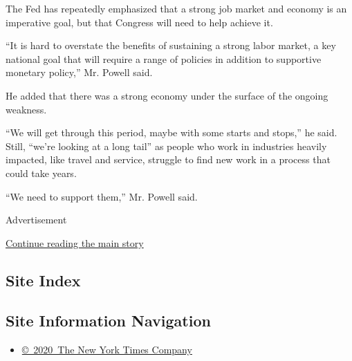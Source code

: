 The Fed has repeatedly emphasized that a strong job market and economy
is an imperative goal, but that Congress will need to help achieve it.

``It is hard to overstate the benefits of sustaining a strong labor
market, a key national goal that will require a range of policies in
addition to supportive monetary policy,'' Mr. Powell said.

He added that there was a strong economy under the surface of the
ongoing weakness.

``We will get through this period, maybe with some starts and stops,''
he said. Still, ``we're looking at a long tail'' as people who work in
industries heavily impacted, like travel and service, struggle to find
new work in a process that could take years.

``We need to support them,'' Mr. Powell said.

Advertisement

\protect\hyperlink{after-bottom}{Continue reading the main story}

\hypertarget{site-index}{%
\subsection{Site Index}\label{site-index}}

\hypertarget{site-information-navigation}{%
\subsection{Site Information
Navigation}\label{site-information-navigation}}

\begin{itemize}
\tightlist
\item
  \href{https://help.nytimes3xbfgragh.onion/hc/en-us/articles/115014792127-Copyright-notice}{©~2020~The
  New York Times Company}
\end{itemize}


